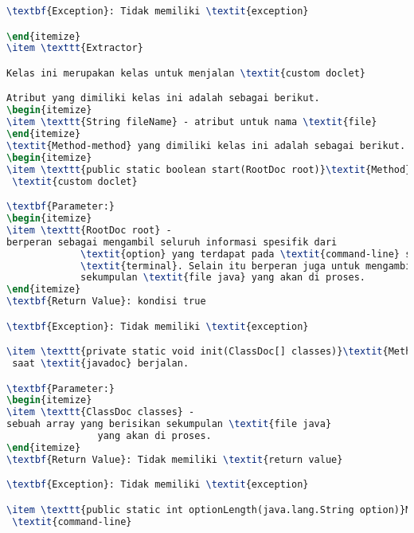 \begin{lstlisting}[language=TeX, caption=Hasil Pengujian kode program perangkat lunak]
\textbf{Exception}: Tidak memiliki \textit{exception}

\end{itemize}
\item \texttt{Extractor}

Kelas ini merupakan kelas untuk menjalan \textit{custom doclet}

Atribut yang dimiliki kelas ini adalah sebagai berikut.
\begin{itemize}
\item \texttt{String fileName} - atribut untuk nama \textit{file}
\end{itemize}
\textit{Method-method} yang dimiliki kelas ini adalah sebagai berikut.
\begin{itemize}
\item \texttt{public static boolean start(RootDoc root)}\textit{Method} ini berperan sebagai \textit{method} untuk menjalankan
 \textit{custom doclet}

\textbf{Parameter:}
\begin{itemize}
\item \texttt{RootDoc root} - 
berperan sebagai mengambil seluruh informasi spesifik dari
             \textit{option} yang terdapat pada \textit{command-line} sebuah
             \textit{terminal}. Selain itu berperan juga untuk mengambil informasi dari
             sekumpulan \textit{file java} yang akan di proses.
\end{itemize}
\textbf{Return Value}: kondisi true

\textbf{Exception}: Tidak memiliki \textit{exception}

\item \texttt{private static void init(ClassDoc[] classes)}\textit{Method} ini berperan untuk menulis kedalam sebuah \textit{file}
 saat \textit{javadoc} berjalan.

\textbf{Parameter:}
\begin{itemize}
\item \texttt{ClassDoc classes} - 
sebuah array yang berisikan sekumpulan \textit{file java}
                yang akan di proses.
\end{itemize}
\textbf{Return Value}: Tidak memiliki \textit{return value}

\textbf{Exception}: Tidak memiliki \textit{exception}

\item \texttt{public static int optionLength(java.lang.String option)}Method untuk menghitung banyak option yang digunakan pada
 \textit{command-line}


\end{lstlisting}
